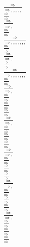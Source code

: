 \documentclass[11pt]{article}
\begin{document}
\begin{center}
\bigskip
\\$\frac{\Rightarrow }{\Rightarrow , , , , , }$
\bigskip
\\$\frac{\Rightarrow }{\Rightarrow }$
\bigskip
\\$\frac{\Rightarrow }{\Rightarrow , }$
\bigskip
\\$\frac{\Rightarrow }{\Rightarrow }$
\bigskip
\\$\frac{\Rightarrow }{\Rightarrow , , , , , , , }$
\bigskip
\\$\frac{\Rightarrow }{\Rightarrow }$
\bigskip
\\$\frac{\Rightarrow }{\Rightarrow , }$
\bigskip
\\$\frac{\Rightarrow }{\Rightarrow }$
\bigskip
\\$\frac{\Rightarrow }{\Rightarrow , , , , , , , }$
\bigskip
\\$\frac{\Rightarrow }{\Rightarrow }$
\bigskip
\\$\frac{\Rightarrow }{\Rightarrow , }$
\bigskip
\\$\frac{\Rightarrow }{\Rightarrow }$
\bigskip
\\$\frac{\Rightarrow }{\Rightarrow }$
\bigskip
\\$\frac{\Rightarrow }{\Rightarrow }$
\bigskip
\\$\frac{\Rightarrow }{\Rightarrow , }$
\bigskip
\\$\frac{\Rightarrow }{\Rightarrow }$
\bigskip
\\$\frac{\Rightarrow }{\Rightarrow }$
\bigskip
\\$\frac{\Rightarrow }{\Rightarrow }$
\bigskip
\\$\frac{\Rightarrow }{\Rightarrow , }$
\bigskip
\\$\frac{\Rightarrow }{\Rightarrow }$
\bigskip
\\$\frac{\Rightarrow }{\Rightarrow }$
\bigskip
\\$\frac{\Rightarrow }{\Rightarrow }$
\bigskip
\\$\frac{\Rightarrow }{\Rightarrow , }$
\bigskip
\\$\frac{\Rightarrow }{\Rightarrow }$
\bigskip
\\$\frac{\Rightarrow }{\Rightarrow }$
\bigskip
\\$\frac{\Rightarrow }{\Rightarrow }$
\bigskip
\\$\frac{\Rightarrow }{\Rightarrow , }$
\bigskip
\\$\frac{\Rightarrow }{\Rightarrow }$
\bigskip
\\$\frac{\Rightarrow }{\Rightarrow }$
\bigskip
\\$\frac{\Rightarrow }{\Rightarrow }$

\end{center}
\end{document}
